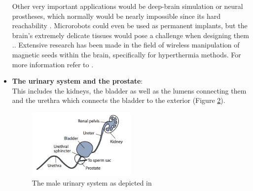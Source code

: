 \begin{itemize}
\begin{figure}[ht]
	\label{fig:nervoussystem}
\end{figure}
Other very important applications would be deep-brain simulation or neural prostheses, which normally would be nearly impossible since its hard reachability \cite{Nelson2010}.  Microrobots could even be used as permanent implants, but the brain's extremely delicate tissues would pose a challenge when designing them \cite{Nelson2010}.. Extensive research has been made in the field of wireless manipulation of magnetic seeds within the brain, specifically for hyperthermia methods. For more information refer to \cite{Molloy1990}.
\item \textbf{The urinary system and the prostate}: \\ This includes the kidneys, the bladder as well as the lumens connecting them and the urethra which connects the bladder to the exterior \cite{Nelson2010} (Figure \ref{fig:urinary}). 
\begin{figure}[ht]
	\centering
  \includegraphics[width=0.5\textwidth]{Pictures/urinarysystem.png}
	\caption{The male urinary system as depicted in \cite{Nelson2010}}
	\label{fig:urinary}
\end{figure}


\end{itemize}

